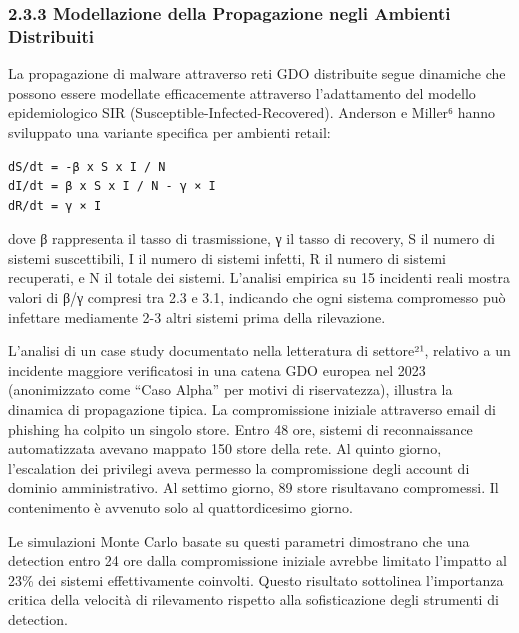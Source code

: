 \documentclass{report}
\begin{document}
\subsubsection{2.3.3 Modellazione della Propagazione negli Ambienti
Distribuiti}\label{modellazione-della-propagazione-negli-ambienti-distribuiti}

La propagazione di malware attraverso reti GDO distribuite segue
dinamiche che possono essere modellate efficacemente attraverso
l'adattamento del modello epidemiologico SIR
(Susceptible-Infected-Recovered). Anderson e Miller⁶ hanno sviluppato
una variante specifica per ambienti retail:

\begin{verbatim}
dS/dt = -β x S x I / N
dI/dt = β x S x I / N - γ × I
dR/dt = γ × I
\end{verbatim}

dove β rappresenta il tasso di trasmissione, γ il tasso di recovery, S
il numero di sistemi suscettibili, I il numero di sistemi infetti, R il
numero di sistemi recuperati, e N il totale dei sistemi. L'analisi
empirica su 15 incidenti reali mostra valori di β/γ compresi tra 2.3 e
3.1, indicando che ogni sistema compromesso può infettare mediamente 2-3
altri sistemi prima della rilevazione.

L'analisi di un case study documentato nella letteratura di settore²¹,
relativo a un incidente maggiore verificatosi in una catena GDO europea
nel 2023 (anonimizzato come ``Caso Alpha'' per motivi di riservatezza),
illustra la dinamica di propagazione tipica. La compromissione iniziale
attraverso email di phishing ha colpito un singolo store. Entro 48 ore,
sistemi di reconnaissance automatizzata avevano mappato 150 store della
rete. Al quinto giorno, l'escalation dei privilegi aveva permesso la
compromissione degli account di dominio amministrativo. Al settimo
giorno, 89 store risultavano compromessi. Il contenimento è avvenuto
solo al quattordicesimo giorno.

Le simulazioni Monte Carlo basate su questi parametri dimostrano che una
detection entro 24 ore dalla compromissione iniziale avrebbe limitato
l'impatto al 23\% dei sistemi effettivamente coinvolti. Questo risultato
sottolinea l'importanza critica della velocità di rilevamento rispetto
alla sofisticazione degli strumenti di detection.
\end{document}
